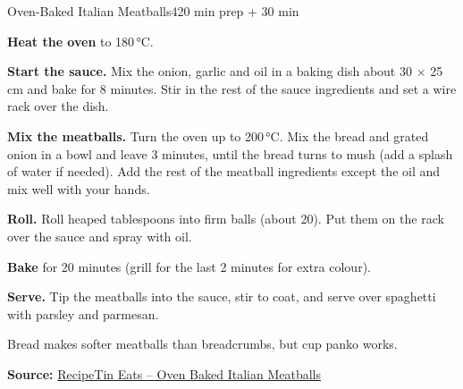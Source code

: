 \begin{recipebox}{Oven-Baked Italian Meatballs}{4}{20 min prep + 30 min}
\begin{method}
  \item \textbf{Heat the oven} to 180\,°C.
  \item \textbf{Start the sauce.} Mix the onion, garlic and oil in a baking dish about
        30 $\times$ 25\,cm and bake for 8 minutes. Stir in the rest of the sauce
        ingredients and set a wire rack over the dish.
  \item \textbf{Mix the meatballs.} Turn the oven up to 200\,°C. Mix the bread and
        grated onion in a bowl and leave 3 minutes, until the bread turns to mush
        (add a splash of water if needed). Add the rest of the meatball ingredients
        except the oil and mix well with your hands.
  \item \textbf{Roll.} Roll heaped tablespoons into firm balls (about 20). Put them
        on the rack over the sauce and spray with oil.
  \item \textbf{Bake} for 20 minutes (grill for the last 2 minutes for extra colour).
  \item \textbf{Serve.} Tip the meatballs into the sauce, stir to coat, and serve over
        spaghetti with parsley and parmesan.
\end{method}

\begin{notelist}
  \item Bread makes softer meatballs than breadcrumbs, but  cup panko
        works.
\end{notelist}

\noindent\textbf{Source:} \href{https://www.recipetineats.com/oven-baked-italian-meatballs/}{RecipeTin Eats -- Oven Baked Italian Meatballs}

\end{recipebox}

